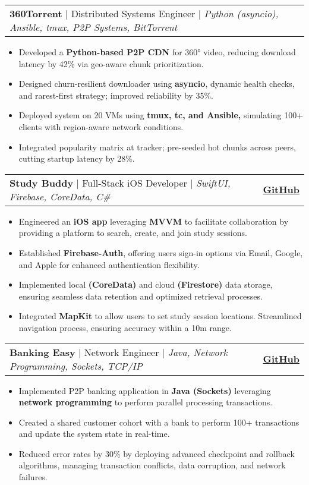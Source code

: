 \documentclass[letterpaper,11pt]{article}
\makeatletter
\newcommand{\resumeItem}[1]{
  \item\small{\fontsize{10}{11}\selectfont
    {#1 \vspace{-1pt}}
  }
}
\newcommand{\resumeProjectHeading}[2]{
    \item
    \begin{tabular*}{0.97\textwidth}{l@{\extracolsep{\fill}}r}
      {\small#1} & {\small#2} \\
    \end{tabular*}\vspace{-6pt}
}
\newcommand{\resumeItemListStart}{\begin{itemize}[leftmargin=0.20in]}
\newcommand{\resumeItemListEnd}{\end{itemize}\vspace{-6pt}}
\newcommand{\projectHeadingColor}{\color{Blue}}
\newcommand{\github}{\color{Blue}\textbf{GitHub}}
\makeatother
\begin{document}
    \resumeProjectHeading
    {\projectHeadingColor\textbf{360Torrent} $|$ {Distributed Systems Engineer} $|$ \emph{\color{Black} Python (asyncio), Ansible, tmux, P2P Systems, BitTorrent}}{}
    \resumeItemListStart
        \resumeItem{Developed a \textbf{Python-based P2P CDN} for 360° video, reducing download latency by 42\% via geo-aware chunk prioritization.}
        \resumeItem{Designed churn-resilient downloader using \textbf{asyncio}, dynamic health checks, and rarest-first strategy; improved reliability by 35\%.}
        \resumeItem{Deployed system on 20 VMs using \textbf{tmux, tc, and Ansible,} simulating 100+ clients with region-aware network conditions.}
        \resumeItem{Integrated popularity matrix at tracker; pre-seeded hot chunks across peers, cutting startup latency by 28\%.}
    \resumeItemListEnd

    \resumeProjectHeading
    {\projectHeadingColor\textbf{Study Buddy} $|$ {Full-Stack iOS Developer} $|$ \emph{\color{Black}SwiftUI, Firebase, CoreData, C\#}}{\href{https://github.com/sjain166/StudyBuddy}{\github}}
    \resumeItemListStart
        \resumeItem{Engineered an \textbf{iOS app} leveraging \textbf{MVVM} to facilitate collaboration by providing a platform to search, create, and join study sessions.}
        \resumeItem{Established \textbf{Firebase-Auth}, offering users sign-in options via Email, Google, and Apple for enhanced authentication flexibility.}
        \resumeItem{Implemented local \textbf{(CoreData)} and cloud \textbf{(Firestore)} data storage, ensuring seamless data retention and optimized retrieval processes.}
        \resumeItem{Integrated \textbf{MapKit} to allow users to set study session locations. Streamlined navigation process, ensuring accuracy within a 10m range.}
    \resumeItemListEnd

    \resumeProjectHeading
    {\projectHeadingColor\textbf{Banking Easy} $|$ {Network Engineer} $|$ \emph{\color{Black}Java, Network Programming, Sockets, TCP/IP}}{\href{https://github.com/sjain166/CSE-434-Socket_Project}{\github}}
    \resumeItemListStart
        \resumeItem{Implemented P2P banking application in \textbf{Java (Sockets)} leveraging \textbf{network programming} to perform parallel processing transactions.}
        \resumeItem{Created a shared customer cohort with a bank to perform 100+ transactions and update the system state in real-time.}
        \resumeItem{Reduced error rates by 30\% by deploying advanced checkpoint and rollback algorithms, managing transaction conflicts, data corruption, and network failures.}
    \resumeItemListEnd
\end{document}
